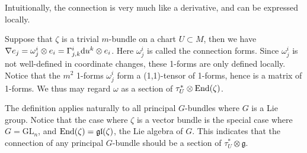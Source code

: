 	Intuitionally, the connection is very much like a derivative, and can be expressed locally. 
	\begin{thm}\label{Christoffel_symb}
		Suppose that $\zeta$ is a trivial $m$-bundle on a chart $U\subset M$, then we have $\nabla e_j=\omega^i_j\otimes e_i=\Gamma^i_{j,k}\mathrm{d} u^k\otimes e_i$. Here $\omega^i_j$ is called the connection forms. Since $\omega^i_j$ is not well-defined in coordinate changes, these 1-forms are only defined locally. \\
		Notice that the $m^2$ 1-forms $\omega^i_j$ form a (1,1)-tensor of 1-forms, hence is a matrix of 1-forms. We thus may regard $\omega$ as a section of $\tau^*_U\otimes\operatorname{\mathrm{End}}(\zeta)$. 
	\end{thm}
	\begin{remark}
		The definition applies naturally to all principal $G$-bundles where $G$ is a Lie group. Notice that the case where $\zeta$ is a vector bundle is the special case where $G=\mathrm{GL}_n$, and $\operatorname{\mathrm{End}}(\zeta)=\mathfrak{gl}(\zeta)$, the Lie algebra of $G$. This indicates that the connection of any principal $G$-bundle should be a section of $\tau^*_U\otimes\mathfrak{g}$. 
	\end{remark}

